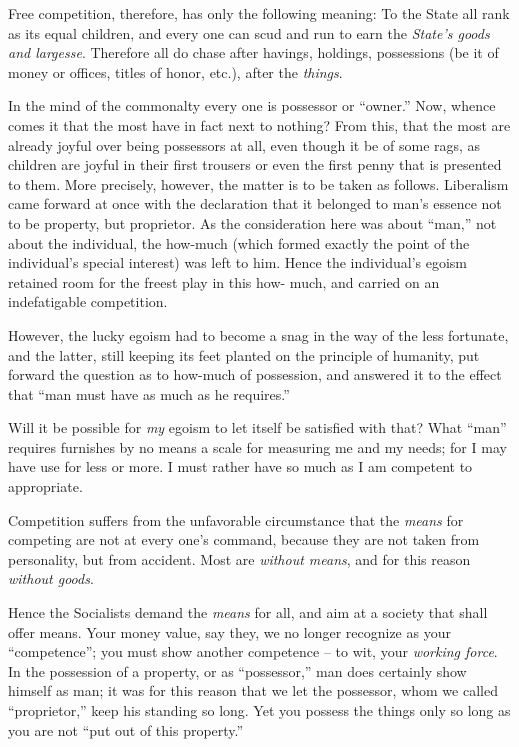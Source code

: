 Free competition, therefore, has only the following meaning: To the State all 
rank as its equal children, and every one can scud and run to earn the 
\textit{State's goods and largesse}. Therefore all do chase after havings, 
holdings, possessions (be it of money or offices, titles of honor, etc.), 
after the \textit{things}.

In the mind of the commonalty every one is possessor or ``owner.'' Now, 
whence comes it that the most have in fact next to nothing? From this, that 
the most are already joyful over being possessors at all, even though it be of 
some rags, as children are joyful in their first trousers or even the first 
penny that is presented to them. More precisely, however, the matter is to be 
taken as follows. Liberalism came forward at once with the declaration that it 
belonged to man's essence not to be property, but proprietor. As the 
consideration here was about ``man,'' not about the individual, the how-much 
(which formed exactly the point of the individual's special interest) was left 
to him. Hence the individual's egoism retained room for the freest play in 
this how- much, and carried on an indefatigable competition.

However, the lucky egoism had to become a snag in the way of the less 
fortunate, and the latter, still keeping its feet planted on the principle of 
humanity, put forward the question as to how-much of possession, and answered 
it to the effect that ``man must have as much as he requires.''

Will it be possible for \textit{my} egoism to let itself be satisfied with 
that? What ``man'' requires furnishes by no means a scale for measuring me 
and my needs; for I may have use for less or more. I must rather have so much 
as I am competent to appropriate.

Competition suffers from the unfavorable circumstance that the \textit{means} 
for competing are not at every one's command, because they are not taken from 
personality, but from accident. Most are \textit{without means}, and for this 
reason \textit{without goods}.

Hence the Socialists demand the \textit{means} for all, and aim at a society 
that shall offer means. Your money value, say they, we no longer recognize as 
your ``competence''; you must show another competence -- to wit, your 
\textit{working force}. In the possession of a property, or as 
``possessor,'' man does certainly show himself as man; it was for this 
reason that we let the possessor, whom we called ``proprietor,'' keep his 
standing so long. Yet you possess the things only so long as you are not 
``put out of this property.''

